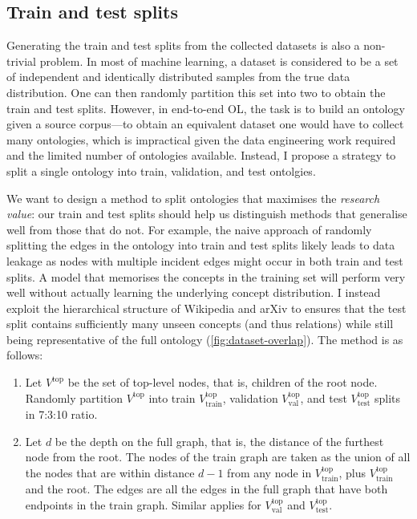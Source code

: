 \subsection{Train and test splits}

Generating the train and test splits from the collected datasets is also a non-trivial problem. In most of machine learning, a dataset is considered to be a set of independent and identically distributed samples from the true data distribution. One can then randomly partition this set into two to obtain the train and test splits. However, in end-to-end OL, the task is to build an ontology given a source corpus---to obtain an equivalent dataset one would have to collect many ontologies, which is impractical given the data engineering work required and the limited number of ontologies available. Instead, I propose a strategy to split a single ontology into train, validation, and test ontolgies.



We want to design a method to split ontologies that maximises the \emph{research value}: our train and test splits should help us distinguish methods that generalise well from those that do not. For example, the naive approach of randomly splitting the edges in the ontology into train and test splits likely leads to data leakage as nodes with multiple incident edges might occur in both train and test splits. A model that memorises the concepts in the training set will perform very well without actually learning the underlying concept distribution. I instead exploit the hierarchical structure of Wikipedia and arXiv to ensures that the test split contains sufficiently many unseen concepts (and thus relations) while still being representative of the full ontology (\cref{fig:dataset-overlap}). The method is as follows:
\begin{enumerate}[leftmargin=*]
    \item Let $V^\text{top}$ be the set of top-level nodes, that is, children of the root node. Randomly partition $V^\text{top}$ into train $V^\text{top}_{\text{train}}$, validation $V^\text{top}_{\text{val}}$, and test $V^\text{top}_{\text{test}}$ splits in 7:3:10 ratio.
    \item Let $d$ be the depth on the full graph, that is, the distance of the furthest node from the root. The nodes of the train graph are taken as the union of all the nodes that are within distance $d - 1$ from any node in $V^\text{top}_\text{train}$, plus $V_\text{train}^\text{top}$ and the root. The edges are all the edges in the full graph that have both endpoints in the train graph. Similar applies for $V^\text{top}_\text{val}$ and $V^\text{top}_\text{test}$.
\end{enumerate}

